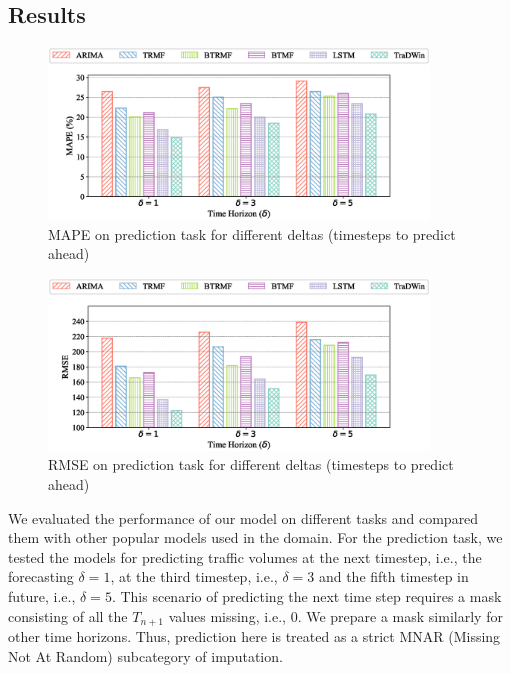 \subsection{Results}

\begin{figure}[]
    \centering
    \includegraphics[width=0.9\textwidth]{mape_pred.eps}
    \caption{MAPE on prediction task for different deltas (timesteps to predict ahead)}
    \label{fig:mape_pred}
\end{figure}

\begin{figure}[]
    \centering
    \includegraphics[width=0.9\textwidth]{rmse_pred.eps}
    \caption{RMSE on prediction task for different deltas (timesteps to predict ahead)}
    \label{fig:rmse_pred}
\end{figure}

We evaluated the performance of our model on different tasks and compared them with other popular models used in the domain. For the prediction task, we tested the models for predicting traffic volumes at the next timestep, i.e., the forecasting $\delta = 1$, at the third timestep, i.e., $\delta = 3$ and the fifth timestep in future, i.e., $\delta = 5$. This scenario of predicting the next time step requires a mask consisting of all the $T_{n+1}$ values missing, i.e., 0. We prepare a mask similarly for other time horizons. Thus, prediction here is treated as a strict MNAR (Missing Not At Random) subcategory of imputation.

